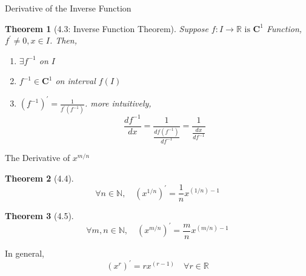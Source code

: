 \documentclass[a4paper,11pt]{article}
\newtheorem{thm}{Theorem}
\begin{document}
\begin{frame}[t]{Derivative of the Inverse Function}
	\begin{thm}
		[4.3: Inverse Function Theorem] Suppose $f:I\rightarrow \mathbb{R} \text{ is } \mathbf{C}^1$ Function, $f^\prime \neq 0, x\in I$. Then,
		\begin{enumerate}
			\item $\exists f^{-1}$ on $I$
			\item $f^{-1}\in \mathbf{C}^1$ on interval $f(I)$
			\item $(f^{-1})^\prime = \frac{1}{f^\prime(f^{-1})}$. more intuitively, 
			\[
				\frac{df^{-1}}{dx} = \frac{1}{\frac{df(f^{-1})}{df^{-1}}}=\frac{1}{\frac{dx}{df^{-1}}}
			\]
		\end{enumerate}
	\end{thm}
\end{frame}

\begin{frame}[t]{The Derivative of $x^{m/n}$}
	\begin{thm}
		[4.4] \[
			\forall n\in\mathbb{N},\quad (x^{1/n})^\prime = \frac{1}{n} x^{(1/n)-1}
		\]
	\end{thm}
	\begin{thm}
		[4.5] \[
			\forall m,n\in\mathbb{N},\quad (x^{m/n})^\prime = \frac{m}{n} x^{(m/n)-1}
		\]
	\end{thm}
	In general, 
	\[
		(x^r)^\prime = rx^{(r-1)}\quad \forall r\in\mathbb{R}
	\]
\end{frame}

\end{document}
